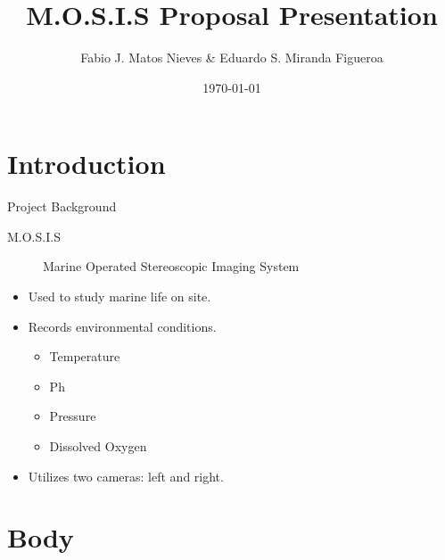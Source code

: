 \documentclass[14pt, aspectratio=169]{beamer}
\title{M.O.S.I.S Proposal Presentation}
\author{Fabio J. Matos Nieves \& Eduardo S. Miranda Figueroa}
\institute{Univerity of Puerto Rico Mayagüez Campus}
\date{\today}
\begin{document}
\begin{frame}
	\maketitle
\end{frame}

\begin{frame}
	\tableofcontents
\end{frame}
\section{Introduction}
\begin{frame}{Project Background}
	\begin{description}
		\item[M.O.S.I.S] Marine Operated Stereoscopic Imaging System
	\end{description}
	\begin{itemize}
		\item Used to study marine life on site.
		\item Records environmental conditions.
		      \begin{itemize}
			      \item Temperature
			      \item Ph
			      \item Pressure
			      \item Dissolved Oxygen
		      \end{itemize}
		\item Utilizes two cameras: left and right.
	\end{itemize}
\end{frame}
\section{Body}
\end{document}
